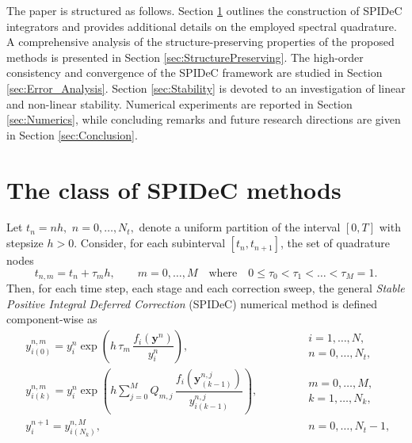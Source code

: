 \documentclass[a4paper,num-refs]{oup-contemporary-spidec}
\begin{document}
The paper is structured as follows. Section \ref{sec:SPIDeC} outlines the construction of SPIDeC integrators and provides additional details on the employed spectral quadrature. A comprehensive analysis of the structure-preserving properties of the proposed methods is presented in Section \ref{sec:StructurePreserving}. The high-order consistency and convergence of the SPIDeC framework are studied in Section \ref{sec:Error_Analysis}. Section \ref{sec:Stability} is devoted to an investigation of linear and non-linear stability. Numerical experiments are reported in Section \ref{sec:Numerics}, while concluding remarks and future research directions are given in Section \ref{sec:Conclusion}.

\section{The class of SPIDeC methods}\label{sec:SPIDeC}
Let $t_n = n h,$ $n=0,\dots,N_t,$ denote a uniform partition of the interval $[0,T]$ with stepsize $h>0.$ Consider, for each subinterval $[t_n,t_{n+1}]$, the set of quadrature nodes
\begin{equation}\label{eq:nodi_quad}
    t_{n,m} = t_n + \tau_m h, \qquad m=0,\dots,M \quad \text{where} \quad 0 \leq \tau_0 < \tau_1 < \dots < \tau_M = 1.
\end{equation}
Then, for each time step, each stage and each correction sweep, the general \emph{Stable Positive Integral Deferred Correction} (SPIDeC) numerical method is defined component-wise as
\begin{equation}\label{eq:SPIDeC}
    \begin{aligned}
        & y^{n,m}_{i(0)} = y_i^n
        \exp\!\left(
        h\,\tau_m \,
        \dfrac{f_i(\bm{y}^n)}{y_i^n}
        \right), 
        &&\begin{array}{l}
            i=1,\dots,N,  \\
            n \!=0,\dots,N_t, 
        \end{array}
         \\
        & y^{n,m}_{i(k)} = y_i^n
        \exp\!\left(
        h \sum_{j=0}^M Q_{m,j}\,
        \dfrac{f_i\!\left(\bm{y}^{n,j}_{(k-1)}\right)}{y^{n,j}_{i(k-1)}}
        \right), 
        &&\begin{array}{l}
            \!m\!=0,\dots,M,  \\
            k=1,\dots,N_k,
        \end{array} 
        \\
        & y^{n+1}_i=y^{n,M}_{i(N_k)}, \ \ \  \qquad \qquad \qquad \qquad \qquad \qquad \qquad \qquad && \begin{array}{l}
            n=0,\dots,N_t-1,
        \end{array} 
    \end{aligned}
\end{equation}
\end{document}
